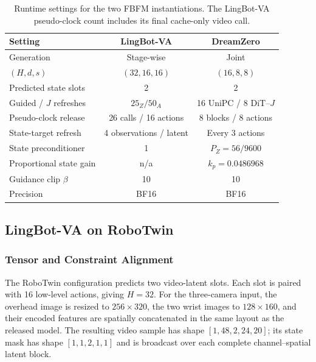 \begin{table}[H]
    \centering
    \small
    \setlength{\tabcolsep}{6pt}
    \begin{tabular}{lcc}
        \toprule
        Setting & LingBot-VA & DreamZero \\
        \midrule
        Generation & Stage-wise & Joint \\
        $(H,d,s)$ & $(32,16,16)$ & $(16,8,8)$ \\
        Predicted state slots & 2 & 2 \\
        Guided / $J$ refreshes & $25_Z/50_A$ & 16 UniPC / 8 DiT--$J$ \\
        Pseudo-clock release & 26 calls / 16 actions & 8 blocks / 8 actions \\
        State-target refresh & 4 observations / latent & Every 3 actions \\
        State preconditioner & 1 & $P_Z=56/9600$ \\
        Proportional state gain & n/a & $k_p=0.0486968$ \\
        Guidance clip $\beta$ & 10 & 10 \\
        Precision & BF16 & BF16 \\
        \bottomrule
    \end{tabular}
    \caption{Runtime settings for the two FBFM instantiations. The LingBot-VA
    pseudo-clock count includes its final cache-only video call.}
    \label{tab:fbfm-instantiation-settings}
\end{table}

\subsection{LingBot-VA on RoboTwin}

\subsubsection{Tensor and Constraint Alignment}

The RoboTwin configuration predicts two video-latent slots. Each slot is paired
with 16 low-level actions, giving $H=32$. For the three-camera input, the
overhead image is resized to $256\times320$, the two wrist images to
$128\times160$, and their encoded features are spatially concatenated in the
same layout as the released model. The resulting video sample has shape
$[1,48,2,24,20]$; its state mask has shape $[1,1,2,1,1]$ and is broadcast over
each complete channel--spatial latent block.

